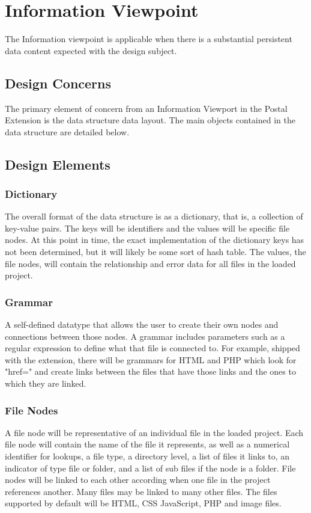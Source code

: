 \documentclass[letterpaper,10pt,titlepage,draftclsnofoot,onecolumn,onesided] {IEEEtran}
\begin{document}
\section{Information Viewpoint}
The Information viewpoint is applicable when there is a substantial persistent data content expected with
the design subject. 

\subsection{Design Concerns}
The primary element of concern from an Information Viewport in the Postal Extension is the data structure data layout. 
The main objects contained in the data structure are detailed below.

\subsection{Design Elements}

\subsubsection{Dictionary}
The overall format of the data structure is as a dictionary, that is, a collection of key-value pairs. 
The keys will be identifiers and the values will be specific file nodes. 
At this point in time, the exact implementation of the dictionary keys has not been determined, but it will likely be some sort of hash table.
The values, the file nodes, will contain the relationship and error data for all files in the loaded project.

\subsubsection{Grammar} A self-defined datatype that allows the user to create their own nodes and connections between those nodes.
A grammar includes parameters such as a regular expression to define what that file is connected to.
For example, shipped with the extension, there will be grammars for HTML and PHP which look for "href=" and create links between the files that have those links and the ones to which they are linked.

\subsubsection{File Nodes}
A file node will be representative of an individual file in the loaded project. 
Each file node will contain the name of the file it represents, as well as a numerical identifier for lookups, a file type, a directory level, a list of files it links to, an indicator of type file or folder, and a list of sub files if the node is a folder.
File nodes will be linked to each other according when one file in the project references another. 
Many files may be linked to many other files.
The files supported by default will be HTML, CSS JavaScript, PHP and image files.
		
\end{document}
